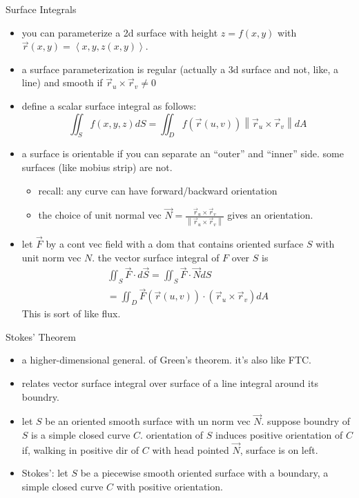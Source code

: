 \documentclass[11pt]{article}
\theoremstyle{definition}
\newcommand{\col}[1]{\begin{minipage}{\columnwidth}#1\end{minipage}}
\newcommand{\magn}[1]{\left\lVert #1 \right\rVert}
\begin{document}
\newpage
\begin{multicols}{2}
  \col{
    Surface Integrals
    \begin{itemize}
      \item you can parameterize a 2d surface with height $z=f(x,y)$ with $\vec{r}(x,y) = \left<x,y,z(x,y)\right>$.
      \item a surface parameterization is regular (actually a 3d surface and not, like, a line) and smooth if $\vec{r}_u \times \vec{r}_v \ne 0$
      \item define a scalar surface integral as follows:
      \[ \iint_S f(x,y,z)dS = \iint_D f(\vec{r}(u,v))\magn{\vec{r}_u\times\vec{r}_v}dA \]
      \item a surface is orientable if you can separate an ``outer'' and ``inner'' side. some surfaces (like mobius strip) are not.
      \begin{itemize}
        \item recall: any curve can have forward/backward orientation
        \item the choice of unit normal vec $\vec{N}=\frac{\vec{r}_u\times\vec{r}_v}{\magn{{\vec{r}_u\times\vec{r}_v}}}$ gives an orientation.
      \end{itemize}
      \item let $\vec{F}$ by a cont vec field with a dom that contains oriented surface $S$ with unit norm vec $N$. the vector surface integral of $F$ over $S$ is 
      \begin{gather*}
        \iint_S \vec{F}\cdot d\vec{S} = \iint_S \vec{F}\cdot\vec{N}dS \\
        = \iint_D \vec{F}(\vec{r}(u,v))\cdot(\vec{r}_u \times\vec{r}_v) dA
      \end{gather*}
      This is sort of like flux.
    \end{itemize}
  }
  \col{
    Stokes' Theorem
    \begin{itemize}
      \item a higher-dimensional general. of Green's theorem. it's also like FTC.
      \item relates vector surface integral over surface of a line integral around its boundry.
      \item let $S$ be an oriented smooth surface with un norm vec $\vec{N}$. suppose boundry of $S$ is a simple closed curve $C$. orientation of $S$ induces positive orientation of $C$ if, walking in positive dir of $C$ with head pointed $\vec{N}$, surface is on left.
      \item Stokes': let $S$ be a piecewise smooth oriented surface with a boundary, a simple closed curve $C$ with positive orientation. 

\end{itemize}}
\end{multicols}
\end{document}
